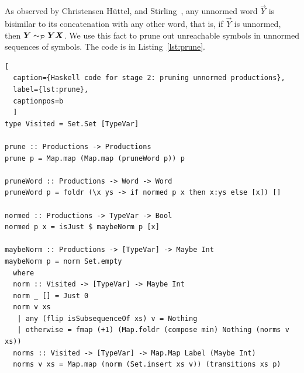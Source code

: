
As observed by Christensen H\"uttel, and
Stirling~\cite{DBLP:journals/iandc/ChristensenHS95}, any unnormed
word $\vec Y$ is bisimilar to its concatenation with any other
word, that is, if $\vec Y$ is unnormed, then
$\vec Y \ProdEquiv \vec Y \vec X$.
%
%
We use this fact
to prune out unreachable symbols in unnormed sequences of symbols. The
code is in Listing~\ref{lst:prune}.
%

\begin{lstlisting}[
  caption={Haskell code for stage 2: pruning unnormed productions},
  label={lst:prune},
  captionpos=b
  ]
type Visited = Set.Set [TypeVar]

prune :: Productions -> Productions
prune p = Map.map (Map.map (pruneWord p)) p

pruneWord :: Productions -> Word -> Word
pruneWord p = foldr (\x ys -> if normed p x then x:ys else [x]) []

normed :: Productions -> TypeVar -> Bool
normed p x = isJust $ maybeNorm p [x]

maybeNorm :: Productions -> [TypeVar] -> Maybe Int
maybeNorm p = norm Set.empty
  where
  norm :: Visited -> [TypeVar] -> Maybe Int
  norm _ [] = Just 0
  norm v xs
   | any (flip isSubsequenceOf xs) v = Nothing
   | otherwise = fmap (+1) (Map.foldr (compose min) Nothing (norms v xs))
  norms :: Visited -> [TypeVar] -> Map.Map Label (Maybe Int)
  norms v xs = Map.map (norm (Set.insert xs v)) (transitions xs p)
\end{lstlisting}

